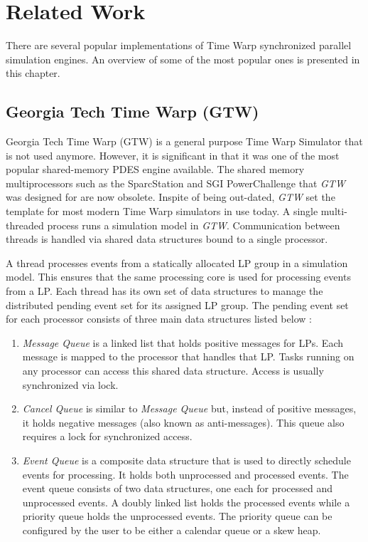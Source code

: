 \documentclass[11pt]{book}
\begin{document}
\chapter{Related Work}\label{chapter:related_work}

There are several popular implementations of Time Warp synchronized parallel simulation engines.  An overview
of some of the most popular ones is presented in this chapter.

\section{Georgia Tech Time Warp (GTW)}

Georgia Tech Time Warp \cite{das-94} (GTW) is a general purpose Time Warp Simulator that is not used anymore.
However, it is significant in that it was one of the most popular shared-memory PDES engine available.  The
shared memory multiprocessors such as the SparcStation and SGI PowerChallenge that \emph{GTW} was designed for
are now obsolete.  Inspite of being out-dated, \emph{GTW} set the template for most modern Time Warp
simulators in use today.  A single multi-threaded process runs a simulation model in \emph{GTW}.
Communication between threads is handled via shared data structures bound to a single processor.

A thread processes events from a statically allocated LP group in a simulation model.  This ensures that the
same processing core is used for processing events from a LP.  Each thread has its own set of data structures
to manage the distributed pending event set for its assigned LP group.  The pending event set for each
processor consists of three main data structures listed below \cite{das-94}:

\begin{enumerate}

\item \emph{Message Queue} is a linked list that holds positive messages for LPs.  Each message is mapped to
  the processor that handles that LP\@. Tasks running on any processor can access this shared data
  structure.  Access is usually synchronized via lock.

\item \emph{Cancel Queue} is similar to \emph{Message Queue} but, instead of positive messages, it holds
  negative messages (also known as anti-messages).  This queue also requires a lock for synchronized access.

\item \emph{Event Queue} is a composite data structure that is used to directly schedule events for
  processing.  It holds both unprocessed and processed events.  The event queue consists of two data
  structures, one each for processed and unprocessed events.  A doubly linked list holds the processed events
  while a priority queue holds the unprocessed events.  The priority queue can be configured by the user to be
  either a calendar queue or a skew heap.

\end{enumerate}
\end{document}
